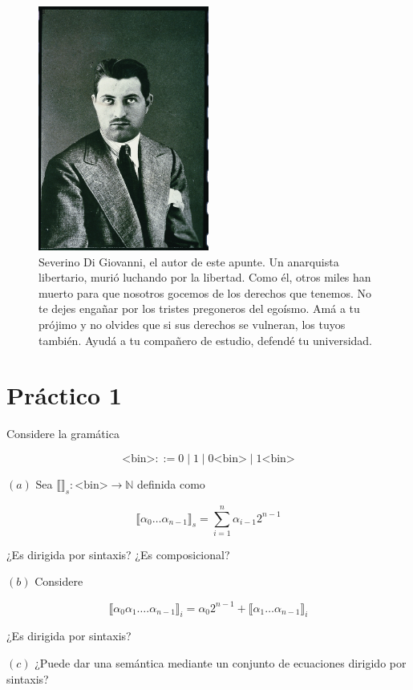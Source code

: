 \documentclass[a4paper, 12pt]{article}
\begin{document}
 \begin{figure}[h!]
 \centering
  \includegraphics[width=0.5\textwidth]{../Images/SeverinoDiGiovanni.jpg}
 \caption{Severino Di Giovanni, el autor de este apunte. Un anarquista
   libertario, murió luchando por la libertad. Como él, otros miles han muerto
   para que nosotros gocemos de los derechos que tenemos. No te dejes engañar
   por los tristes pregoneros del egoísmo. Amá a tu prójimo y no olvides que si
   sus derechos se vulneran, los tuyos también. Ayudá a tu compañero de estudio,
 defendé tu universidad. }
 \end{figure}

\pagebreak
\tableofcontents
\newpage

\section{Práctico 1}

\begin{myframe}
  Considere la gramática 

  \begin{equation*}
    \text{<bin>} ::= 0 \mid 1 \mid 0\text{<bin>} \mid 1\text{<bin>}
  \end{equation*}

  $(a)$ Sea $\llbracket  \rrbracket_s : \text{<bin>} \to \mathbb{N}$ definida
  como 

  \begin{equation*}
    \llbracket \alpha_0\ldots\alpha_{n-1} \rrbracket_{s} = \sum_{i=1}^n
    \alpha_{i-1}2^{n-1}
  \end{equation*}

  ¿Es dirigida por sintaxis? ¿Es composicional? 

  $(b)$ Considere 

  \begin{equation*}
    \llbracket \alpha_0 \alpha_1 \ldots. \alpha_{n-1} \rrbracket_i =
    \alpha_{0} 2^{n-1} + \llbracket \alpha_1 \ldots \alpha_{n-1} \rrbracket_i
  \end{equation*}

  ¿Es dirigida por sintaxis? 

  $(c)$ ¿Puede dar una semántica mediante un conjunto de ecuaciones dirigido por
  sintaxis?
\end{myframe}
\end{document}
